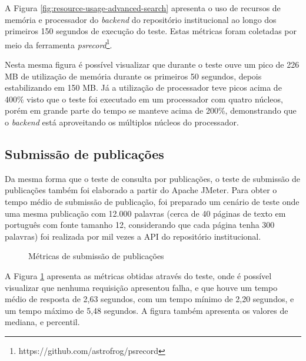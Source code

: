 A Figura \ref{fig:resource-usage-advanced-search} apresenta o uso de recursos
de memória e processador do \emph{backend} do repositório institucional ao longo
dos primeiros 150 segundos de execução do teste. Estas métricas foram coletadas por
meio da ferramenta \emph{psrecord}\footnote{https://github.com/astrofrog/psrecord}.

Nesta mesma figura é possível visualizar que durante o teste ouve um pico de 226 MB de utilização
de memória durante os primeiros 50 segundos, depois estabilizando em 150 MB. Já a
utilização de processador teve picos acima de 400\% visto que o teste foi executado em um
processador com quatro núcleos, porém em grande parte do tempo se manteve acima de 200\%,
demonstrando que o \emph{backend} está aproveitando os múltiplos núcleos do processador.

\subsection{Submissão de publicações}

Da mesma forma que o teste de consulta por publicações, o teste de submissão de
publicações também foi elaborado a partir do Apache JMeter. Para obter o tempo médio
de submissão de publicação, foi preparado um cenário de teste onde uma mesma publicação
com 12.000 palavras (cerca de 40 páginas de texto em português com fonte tamanho 12,
considerando que cada página tenha 300 palavras) foi realizada por mil vezes a API do
repositório institucional.

\begin{figure}[H]
    \caption{Métricas de submissão de publicações}
    \label{fig:matrics-create-research}
\end{figure}

A Figura \ref{fig:matrics-create-research} apresenta as métricas obtidas através do
teste, onde é possível visualizar que nenhuma requisição apresentou falha, e que houve
um tempo médio de resposta de 2,63 segundos, com um tempo mínimo de 2,20 segundos, e
um tempo máximo de 5,48 segundos. A figura também apresenta os valores de mediana, e
percentil.


